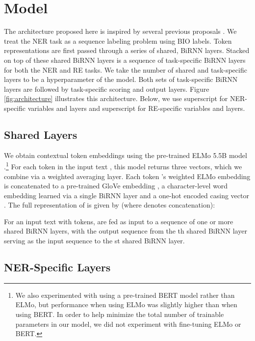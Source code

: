 \documentclass{article}
\begin{document}
\section{Model}

The architecture proposed here is inspired by several previous proposals \cite{katiyar-cardie-2017-going,bekoulis2018joint,nguyen2019end}. We treat the NER task as a sequence labeling problem using BIO labels. Token representations are first passed through a series of shared, BiRNN layers. Stacked on top of these shared BiRNN layers is a sequence of task-specific BiRNN layers for both the NER and RE tasks. We take the number of shared and task-specific layers to be a hyperparameter of the model. Both sets of task-specific BiRNN layers are followed by task-specific scoring and output layers. Figure \ref{fig:architecture} illustrates this architecture. Below, we use superscript  for NER-specific variables and layers and superscript  for RE-specific variables and layers.

\subsection{Shared Layers}

We obtain contextual token embeddings using the pre-trained ELMo 5.5B model \cite{peters2018deep}.\footnote{We also experimented with using a pre-trained BERT model rather than ELMo,  but performance when using ELMo was slightly higher than when using BERT. In order to help minimize the total number of trainable parameters in our model, we did not experiment with fine-tuning ELMo or BERT.} For each token in the input text , this model returns three vectors, which we combine via a weighted averaging layer. Each token 's weighted ELMo embedding  is concatenated to a pre-trained GloVe embedding \cite{pennington2014glove} , a character-level word embedding  learned via a single BiRNN layer \cite{Lample_2016} and a one-hot encoded casing vector . The full representation of  is given by  (where  denotes concatenation):

For an input text with  tokens,  are fed as input to a sequence of one or more shared BiRNN layers, with the output sequence from the th shared BiRNN layer serving as the input sequence to the st shared BiRNN layer. 

\subsection{NER-Specific Layers}
\end{document}
